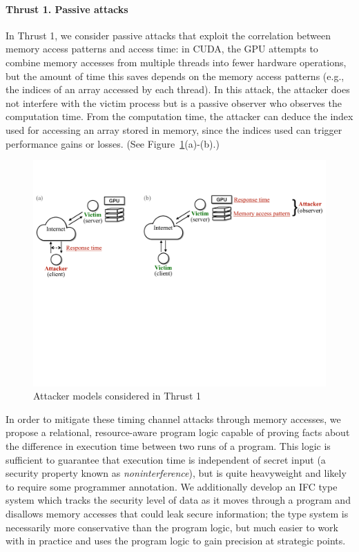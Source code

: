 \paragraph{Thrust 1. Passive attacks}
In Thrust 1, we consider passive attacks that exploit the correlation between memory access patterns and access time: in CUDA, the GPU attempts to combine memory accesses from multiple threads into fewer hardware operations, but the amount of time this saves depends on the memory access patterns (e.g., the indices of an array accessed by each thread).
%
In this attack, the attacker does not interfere with the victim process but is a passive observer who observes the computation time. 
%
From the computation time, the attacker can deduce the index used for accessing an array stored in memory, since the indices used can trigger performance gains or losses.
%
(See Figure~\ref{fig:th1-attack}(a)-(b).)
\begin{figure}[h]
    \includegraphics[clip,trim=0 10cm 0 2cm,width=0.72\pdfpagewidth]{figs/thrust1-fig.pdf}
    \caption{Attacker models considered in Thrust 1 }
    \label{fig:th1-attack}
\end{figure}

In order to mitigate these timing channel attacks through memory accesses, we propose a relational, resource-aware program logic capable of proving facts about the difference in execution time between two runs of a program.
%
This logic is sufficient to guarantee that execution time is independent of secret input (a security property known as {\em noninterference}), but is quite heavyweight and likely to require some programmer annotation.
%
We additionally develop an IFC type system which tracks the security level of data as it moves through a program and disallows memory accesses that could leak secure information; the type system is necessarily more conservative than the program logic, but much easier to work with in practice and uses the program logic to gain precision at strategic points.

